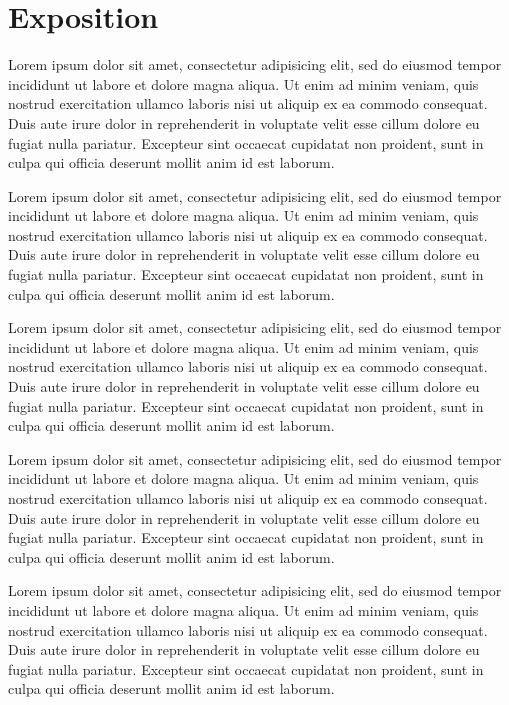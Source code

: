 \documentclass[conference]{acmsiggraph}
\begin{document}
\section{Exposition}

Lorem ipsum dolor sit amet, consectetur adipisicing elit, sed do
eiusmod tempor incididunt ut labore et dolore magna aliqua. Ut enim ad
minim veniam, quis nostrud exercitation ullamco laboris nisi ut
aliquip ex ea commodo consequat. Duis aute irure dolor in
reprehenderit in voluptate velit esse cillum dolore eu fugiat nulla
pariatur. Excepteur sint occaecat cupidatat non proident, sunt in
culpa qui officia deserunt mollit anim id est laborum.

Lorem ipsum dolor sit amet, consectetur adipisicing elit, sed do
eiusmod tempor incididunt ut labore et dolore magna aliqua. Ut enim ad
minim veniam, quis nostrud exercitation ullamco laboris nisi ut
aliquip ex ea commodo consequat. Duis aute irure dolor in
reprehenderit in voluptate velit esse cillum dolore eu fugiat nulla
pariatur. Excepteur sint occaecat cupidatat non proident, sunt in
culpa qui officia deserunt mollit anim id est laborum.

Lorem ipsum dolor sit amet, consectetur adipisicing elit, sed do
eiusmod tempor incididunt ut labore et dolore magna aliqua. Ut enim ad
minim veniam, quis nostrud exercitation ullamco laboris nisi ut
aliquip ex ea commodo consequat. Duis aute irure dolor in
reprehenderit in voluptate velit esse cillum dolore eu fugiat nulla
pariatur. Excepteur sint occaecat cupidatat non proident, sunt in
culpa qui officia deserunt mollit anim id est laborum.

Lorem ipsum dolor sit amet, consectetur adipisicing elit, sed do
eiusmod tempor incididunt ut labore et dolore magna aliqua. Ut enim ad
minim veniam, quis nostrud exercitation ullamco laboris nisi ut
aliquip ex ea commodo consequat. Duis aute irure dolor in
reprehenderit in voluptate velit esse cillum dolore eu fugiat nulla
pariatur. Excepteur sint occaecat cupidatat non proident, sunt in
culpa qui officia deserunt mollit anim id est laborum.

Lorem ipsum dolor sit amet, consectetur adipisicing elit, sed do
eiusmod tempor incididunt ut labore et dolore magna aliqua. Ut enim ad
minim veniam, quis nostrud exercitation ullamco laboris nisi ut
aliquip ex ea commodo consequat. Duis aute irure dolor in
reprehenderit in voluptate velit esse cillum dolore eu fugiat nulla
pariatur. Excepteur sint occaecat cupidatat non proident, sunt in
culpa qui officia deserunt mollit anim id est laborum.
\end{document}
